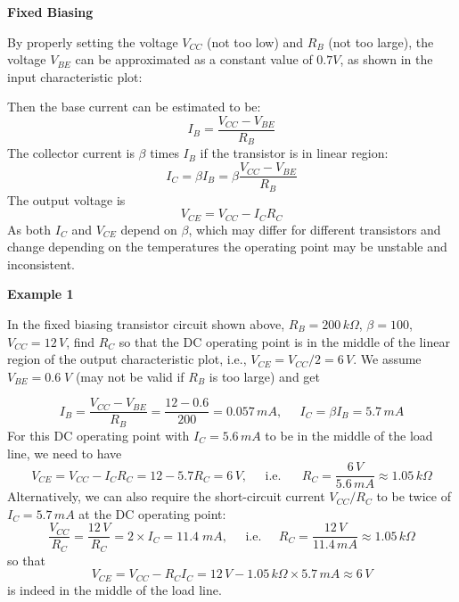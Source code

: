 \documentclass{article}
\begin{document}
{\bf Fixed Biasing} 


By properly setting the voltage $V_{CC}$ (not too low) and $R_B$ (not too 
large), the voltage $V_{BE}$ can be approximated as a constant value of
$0.7V$, as shown in the input characteristic plot: 


Then the base current can be estimated to be:
\begin{equation}
I_B=\frac{V_{CC}-V_{BE}}{R_B} %
\end{equation}
The collector current is $\beta$ times $I_B$ if the transistor is in linear
region:
\begin{equation}
I_C=\beta I_B=\beta \frac{V_{CC}-V_{BE}}{R_B} %
\end{equation}
The output voltage is 
\begin{equation}
V_{CE}=V_{CC}-I_C R_C	
\end{equation}
As both $I_C$ and $V_{CE}$ depend on $\beta$, which may differ for different
transistors and change depending on the temperatures the operating point may
be unstable and inconsistent. 


{\bf Example 1}

In the fixed biasing transistor circuit shown above, $R_B=200\,k\Omega$, 
$\beta=100$, $V_{CC}=12\,V$, find $R_C$ so that the DC operating point is 
in the middle of the linear region of the output characteristic plot, i.e., 
$V_{CE}=V_{CC}/2=6\,V$. We assume $V_{BE}=0.6\;V$ (may not be valid if 
$R_B$ is too large) and get

\begin{equation} 
  I_B=\frac{V_{CC}-V_{BE}}{R_B}=\frac{12-0.6}{200}=0.057\,mA,\;\;\;\;\;
  I_C=\beta I_B=5.7\,mA 
\end{equation}
For this DC operating point with $I_C=5.6\,mA$ to be in the middle of the
load line, we need to have 
\begin{equation}
  V_{CE}=V_{CC}-I_CR_C=12-5.7 R_C=6\,V,\;\;\;\;\;\mbox{i.e.}\;\;\;\;\;\;
  R_C=\frac{6\,V}{5.6\,mA}\approx 1.05\,k\Omega
\end{equation}
Alternatively, we can also require the short-circuit current $V_{CC}/R_C$ 
to be twice of $I_C=5.7\,mA$ at the DC operating point:
\begin{equation} 
  \frac{V_{CC}}{R_C}=\frac{12\,V}{R_C}=2\times I_C=11.4\;mA,\;\;\;\;\;\mbox{i.e.}
  \;\;\;\;\;R_C=\frac{12\,V}{11.4\,mA}\approx 1.05\,k\Omega
\end{equation}
so that
\begin{equation}
  V_{CE}=V_{CC}-R_CI_C=12\,V-1.05\,k\Omega\times 5.7\,mA \approx 6\,V
\end{equation}
is indeed in the middle of the load line.
\end{document}
